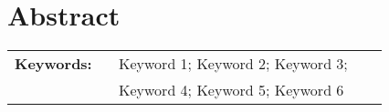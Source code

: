 \section*{Abstract}


\lipsum[1-2]

%
\vfill
%
{\centering %
\begin{tabular}{p{0.25\linewidth} p{0.65\linewidth}}
	\textbf{\Large Keywords:} 	& Keyword 1; Keyword 2; Keyword 3; \\ %
								& Keyword 4; Keyword 5; Keyword 6    %
\end{tabular}
}